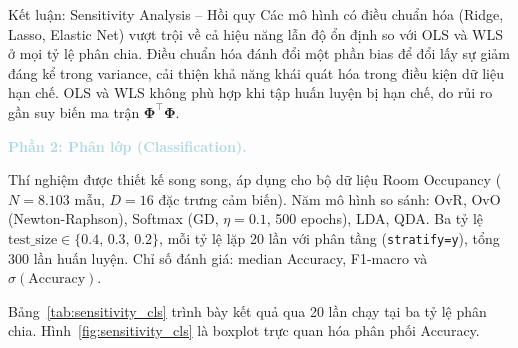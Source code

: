 \begin{importantbox}{Kết luận: Sensitivity Analysis -- Hồi quy}
Các mô hình có điều chuẩn hóa (Ridge, Lasso, Elastic Net) vượt trội về cả hiệu năng lẫn
độ ổn định so với OLS và WLS ở mọi tỷ lệ phân chia.
Điều chuẩn hóa đánh đổi một phần bias để đổi lấy sự giảm đáng kể trong variance,
cải thiện khả năng khái quát hóa trong điều kiện dữ liệu hạn chế.
OLS và WLS không phù hợp khi tập huấn luyện bị hạn chế, do rủi ro gần suy biến ma trận $\boldsymbol{\Phi}^\top\boldsymbol{\Phi}$.
\end{importantbox}

\vspace{0.5em}
\noindent\textcolor{lightblue}{\textbf{Phần 2: Phân lớp (Classification).}}
\vspace{0.5em}

Thí nghiệm được thiết kế song song, áp dụng cho bộ dữ liệu Room Occupancy
($N = 8{.}103$ mẫu, $D = 16$ đặc trưng cảm biến).
Năm mô hình so sánh: OvR, OvO (Newton-Raphson), Softmax (GD, $\eta{=}0.1$, 500 epochs), LDA, QDA.
Ba tỷ lệ $\text{test\_size} \in \{0.4,\, 0.3,\, 0.2\}$, mỗi tỷ lệ lặp 20 lần với phân tầng
(\texttt{stratify=y}), tổng 300 lần huấn luyện.
Chỉ số đánh giá: median Accuracy, F1-macro và $\sigma(\text{Accuracy})$.

Bảng~\ref{tab:sensitivity_cls} trình bày kết quả qua 20 lần chạy tại ba tỷ lệ phân chia.
Hình~\ref{fig:sensitivity_cls} là boxplot trực quan hóa phân phối Accuracy.

\begin{table}[h]
\centering
\caption{Trung vị Accuracy và $\sigma(\text{Accuracy})$ qua 20 lần chạy tại ba tỷ lệ
phân chia (Classification). Số liệu từ 300 lần huấn luyện.}
\label{tab:sensitivity_cls}
\end{table}

